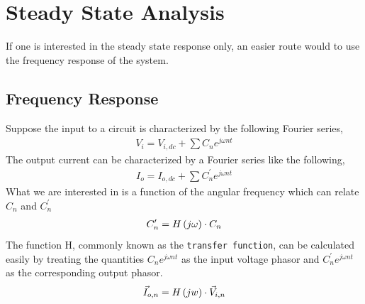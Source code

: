 
\chapter{Steady State Analysis}

\label{Chapter2}


If one is interested in the steady state response only, an easier route would to use the frequency response of the system.
\section{Frequency Response }
    Suppose the input to a circuit is characterized by the following Fourier series,
    \begin{align*}
       V_{i} = V_{i, dc} + \sum C_n e^{j\omega nt} 
    \end{align*}
    The output current can be characterized by a Fourier series like the following,
    \begin{align*}
       I_{o} = I_{o, dc} + \sum C_{n}^{\prime}  e^{j\omega nt} 
    \end{align*}
   What we are interested in is a function of the angular frequency which can relate $C_n$ and $C_{n}^\prime$
   \begin{align*}
       C_n ^\prime = H\left(j\omega\right) \cdot C_n
   \end{align*}
   The function H, commonly known as the \texttt{transfer function}, can be calculated easily by treating the quantities $C_n e^{j\omega nt}$ as the input voltage phasor and $C_n^\prime e^{j\omega nt}$ as the corresponding output phasor. 
   \begin{align*}
       \vec{I}_{o,n} = H\left(jw\right) \cdot \vec{V}_{i,n}
   \end{align*}

